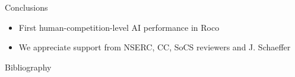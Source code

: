 \documentclass[aspectratio=169,usenames,dvipsnames]{beamer}
\newcommand{\tcb}[1]{\textcolor{m1}{#1}}
\newcommand{\bei}{\begin{itemize}}
\newcommand{\eei}{\end{itemize}}
\newcommand{\ie}{\item}
\numberwithin{equation}{section}
\numberwithin{theorem}{section}
\numberwithin{lem}{section}
\numberwithin{df}{section}
\begin{document}

\begin{frame}{Conclusions}

\bei

\ie First human-competition-level AI performance in {\sc Roco}


\bigskip
\bigskip
\bigskip
\bigskip

\ie \tcb{We appreciate support from NSERC, CC, SoCS reviewers and J. Schaeffer}

\eei


\end{frame}


\begin{frame}[allowframebreaks]{Bibliography}
\renewcommand*{\bibfont}{\footnotesize}
\printbibliography
\end{frame}

\end{document}
